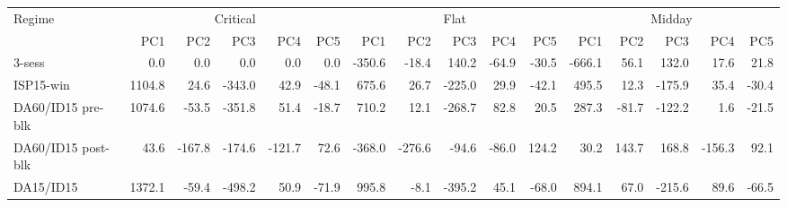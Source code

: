 \begin{tabular}{l r r r r r r r r r r r r r r r}
\toprule
Regime & \multicolumn{5}{c}{Critical} & \multicolumn{5}{c}{Flat} & \multicolumn{5}{c}{Midday} \\
\cmidrule(lr){2-6}\cmidrule(lr){7-11}\cmidrule(lr){12-16}
 & PC1 & PC2 & PC3 & PC4 & PC5 & PC1 & PC2 & PC3 & PC4 & PC5 & PC1 & PC2 & PC3 & PC4 & PC5 \\
\midrule
3-sess & 0.0 & 0.0 & 0.0 & 0.0 & 0.0 & -350.6 & -18.4 & 140.2 & -64.9 & -30.5 & -666.1 & 56.1 & 132.0 & 17.6 & 21.8 \\
ISP15-win & 1104.8 & 24.6 & -343.0 & 42.9 & -48.1 & 675.6 & 26.7 & -225.0 & 29.9 & -42.1 & 495.5 & 12.3 & -175.9 & 35.4 & -30.4 \\
DA60/ID15 pre-blk & 1074.6 & -53.5 & -351.8 & 51.4 & -18.7 & 710.2 & 12.1 & -268.7 & 82.8 & 20.5 & 287.3 & -81.7 & -122.2 & 1.6 & -21.5 \\
DA60/ID15 post-blk & 43.6 & -167.8 & -174.6 & -121.7 & 72.6 & -368.0 & -276.6 & -94.6 & -86.0 & 124.2 & 30.2 & 143.7 & 168.8 & -156.3 & 92.1 \\
DA15/ID15 & 1372.1 & -59.4 & -498.2 & 50.9 & -71.9 & 995.8 & -8.1 & -395.2 & 45.1 & -68.0 & 894.1 & 67.0 & -215.6 & 89.6 & -66.5 \\
\bottomrule
\end{tabular}